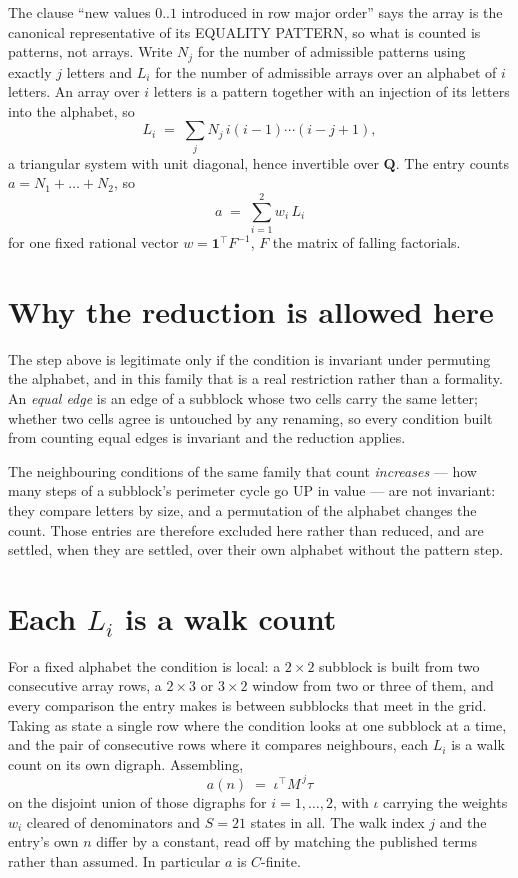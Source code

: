 \documentclass[11pt,a4paper]{article}
\theoremstyle{plain}
\theoremstyle{definition}
\begin{document}
The clause ``new values $0..1$ introduced in row major order'' says the array is the
canonical representative of its EQUALITY PATTERN, so what is counted is patterns, not arrays.
Write $N_j$ for the number of admissible patterns using exactly $j$ letters and $L_i$ for the
number of admissible arrays over an alphabet of $i$ letters. An array over $i$ letters is a
pattern together with an injection of its letters into the alphabet, so
\[
L_i\;=\;\sum_j N_j\,i(i-1)\cdots(i-j+1),
\]
a triangular system with unit diagonal, hence invertible over $\mathbf{Q}$. The entry counts
$a=N_1+\dots+N_{2}$, so
\[
a\;=\;\sum_{i=1}^{2}w_i\,L_i
\]
for one fixed rational vector $w=\mathbf{1}^{\!\top}F^{-1}$, $F$ the matrix of falling
factorials.

\section{Why the reduction is allowed here}

The step above is legitimate only if the condition is invariant under permuting the alphabet,
and in this family that is a real restriction rather than a formality. An \emph{equal edge}
is an edge of a subblock whose two cells carry the same letter; whether two cells agree is
untouched by any renaming, so every condition built from counting equal edges is invariant and
the reduction applies.

The neighbouring conditions of the same family that count \emph{increases} --- how many steps
of a subblock's perimeter cycle go UP in value --- are not invariant: they compare letters by
size, and a permutation of the alphabet changes the count. Those entries are therefore excluded
here rather than reduced, and are settled, when they are settled, over their own alphabet
without the pattern step.

\section{Each $L_i$ is a walk count}

For a fixed alphabet the condition is local: a $2\times2$ subblock is built from two
consecutive array rows, a $2\times3$ or $3\times2$ window from two or three of them, and every
comparison the entry makes is between subblocks that meet in the grid. Taking as state a single
row where the condition looks at one subblock at a time, and the pair of consecutive rows where
it compares neighbours, each $L_i$ is a walk count on its own digraph. Assembling,
\[
a(n)\;=\;\iota^{\!\top}M^{\,j}\tau
\]
on the disjoint union of those digraphs for $i=1,\dots,2$, with $\iota$ carrying the weights
$w_i$ cleared of denominators and $S=21$ states in all. The walk index $j$ and the entry's own
$n$ differ by a constant, read off by matching the published terms rather than assumed. In
particular $a$ is $C$-finite.
\end{document}
